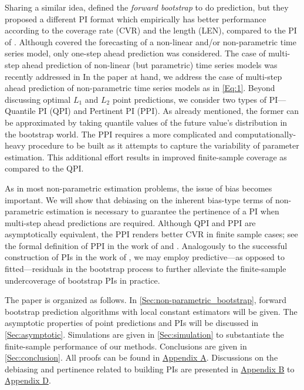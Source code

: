 \documentclass[a4paper]{article}
\begin{document}
Sharing a similar idea, \cite{pan2016bootstrap} defined the \textit{forward bootstrap} to do prediction, but they proposed a different PI format which empirically has better performance according to the coverage rate (CVR) and the length (LEN), compared to the PI of \cite{pascual2004bootstrap}. Although \cite{pan2016bootstrap} covered the forecasting of a non-linear
and/or non-parametric  time series model, only one-step ahead prediction was considered. 
The case of multi-step ahead prediction of non-linear (but parametric)
time series models was recently addressed in \cite{wu2023bootstrap} 
In the paper at hand, we address the  case of multi-step ahead prediction
of non-parametric time series models as in \cref{Eq:1}.   Beyond discussing optimal $L_1$ and $L_2$ point predictions, we consider two types of PI---Quantile PI (QPI) and Pertinent PI (PPI). 
As already mentioned,  the former can be approximated by taking quantile values of the future value's distribution in the bootstrap world. The PPI requires a more complicated and computationally-heavy procedure to be built as it attempts to capture the variability of parameter estimation. This additional effort results in improved finite-sample coverage as compared to the QPI.

As in most non-parametric estimation problems, the issue of bias becomes important.
 We will show that debiasing on the inherent bias-type terms of non-parametric estimation is necessary to guarantee the pertinence of a PI when multi-step ahead predictions are required. Although QPI and PPI are asymptotically equivalent, the PPI renders better CVR in finite sample cases; see the formal definition of PPI in the work of \cite{politis2015model} and \cite{pan2016bootstrap}. Analogously to the successful construction of PIs  in the work of \cite{politis2013model}, we may  employ predictive—as opposed to fitted—residuals in the bootstrap process to further alleviate the finite-sample undercoverage of bootstrap PIs in practice.

The paper is organized as follows. In \cref{Sec:non-parametric_bootstrap}, forward bootstrap prediction algorithms with local constant estimators will be given. The asymptotic properties of point predictions and PIs will be discussed in \cref{Sec:asymptotic}. Simulations are given in \cref{Sec:simulation} to substantiate  the finite-sample performance of our methods. Conclusions are given in \cref{Sec:conclusion}. All proofs can be found in \hyperref[Appendix:Proof]{Appendix A}. Discussions on the debiasing and pertinence related to building PIs are presented in \hyperref[Appendix:advanQPI]{Appendix B} to \hyperref[Appendix:optbandwidthonestvar]{Appendix D}. 
\end{document}
